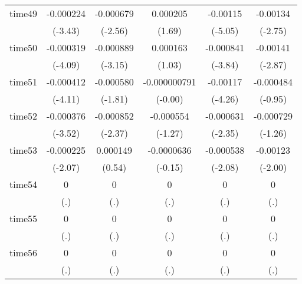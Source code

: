 \begin{table}[htbp]
\begin{tabular}{l*{5}{c}}
time49      &   -0.000224\sym{***}&   -0.000679\sym{*}  &    0.000205         &    -0.00115\sym{***}&    -0.00134\sym{**} \\
            &     (-3.43)         &     (-2.56)         &      (1.69)         &     (-5.05)         &     (-2.75)         \\
time50      &   -0.000319\sym{***}&   -0.000889\sym{**} &    0.000163         &   -0.000841\sym{***}&    -0.00141\sym{**} \\
            &     (-4.09)         &     (-3.15)         &      (1.03)         &     (-3.84)         &     (-2.87)         \\
time51      &   -0.000412\sym{***}&   -0.000580         &-0.000000791         &    -0.00117\sym{***}&   -0.000484         \\
            &     (-4.11)         &     (-1.81)         &     (-0.00)         &     (-4.26)         &     (-0.95)         \\
time52      &   -0.000376\sym{***}&   -0.000852\sym{*}  &   -0.000554         &   -0.000631\sym{*}  &   -0.000729         \\
            &     (-3.52)         &     (-2.37)         &     (-1.27)         &     (-2.35)         &     (-1.26)         \\
time53      &   -0.000225\sym{*}  &    0.000149         &  -0.0000636         &   -0.000538\sym{*}  &    -0.00123\sym{*}  \\
            &     (-2.07)         &      (0.54)         &     (-0.15)         &     (-2.08)         &     (-2.00)         \\
time54      &           0         &           0         &           0         &           0         &           0         \\
            &         (.)         &         (.)         &         (.)         &         (.)         &         (.)         \\
time55      &           0         &           0         &           0         &           0         &           0         \\
            &         (.)         &         (.)         &         (.)         &         (.)         &         (.)         \\
time56      &           0         &           0         &           0         &           0         &           0         \\
            &         (.)         &         (.)         &         (.)         &         (.)         &         (.)         \\

\end{tabular}
\end{table}
